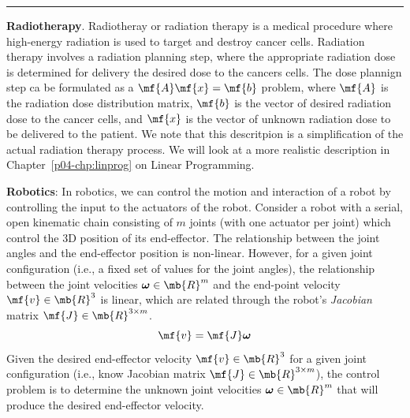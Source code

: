 \begin{boxedstuff}
    \vspace{4mm}
    \hrule
    \begin{example}
        \textbf{Radiotherapy}. Radiotheray or radiation therapy is a medical procedure where high-energy radiation is used to target and destroy cancer cells. Radiation therapy involves a radiation planning step, where the appropriate radiation dose is determined for delivery the desired dose to the cancers cells. The dose plannign step ca be formulated as a $\mf{A}\mf{x} = \mf{b}$ problem, where $\mf{A}$ is the radiation dose distribution matrix, $\mf{b}$ is the vector of desired radiation dose to the cancer cells, and $\mf{x}$ is the vector of unknown radiation dose to be delivered to the patient. We note that this descritpion is a simplification of the actual radiation therapy process. We will look at a more realistic description in Chapter~\ref{p04-chp:linprog} on Linear Programming.
    \end{example}
    \begin{example}
        \textbf{Robotics}: In robotics, we can control the motion and interaction of a robot by controlling the input to the actuators of the robot. Consider a robot with a serial, open kinematic chain consisting of $m$ joints (with one actuator per joint) which control the 3D position of its end-effector. The relationship between the joint angles and the end-effector position is non-linear. However, for a given joint configuration (i.e., a fixed set of values for the joint angles), the relationship between the joint velocities $\bm{\omega} \in \mb{R}^m$ and the end-point velocity $\mf{v} \in \mb{R}^3$ is linear, which are related through the robot's \textit{Jacobian} matrix $\mf{J} \in \mb{R}^{3 \times m}$.
        \[  \mf{v} = \mf{J} \bm{\omega} \]
        Given the desired end-effector velocity $\mf{v}\in \mb{R}^3$ for a given joint configuration (i.e., know Jacobian matrix $\mf{J} \in \mb{R}^{3 \times m}$), the control problem is to determine the unknown joint velocities $\bm{\omega} \in \mb{R}^m$ that will produce the desired end-effector velocity.
    \end{example}
\end{boxedstuff}


